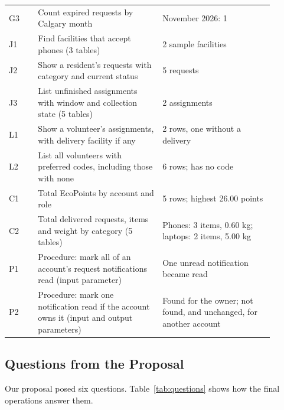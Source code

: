 \documentclass[11pt,letterpaper]{article}
\begin{document}
{\begin{longtable}{@{}lL{0.47\linewidth}L{0.42\linewidth}@{}}
G3 & Count expired requests by Calgary month & November 2026: 1 \\
J1 & Find facilities that accept phones (3 tables) & 2 sample facilities \\
J2 & Show a resident's requests with category and current status & 5 requests \\
J3 & List unfinished assignments with window and collection state (5 tables) & 2 assignments \\
L1 & Show a volunteer's assignments, with delivery facility if any & 2 rows, one without a delivery \\
L2 & List all volunteers with preferred codes, including those with none & 6 rows;  has no code \\
C1 & Total EcoPoints by account and role & 5 rows; highest 26.00 points \\
C2 & Total delivered requests, items and weight by category (5 tables) & Phones: 3 items, 0.60 kg; laptops: 2 items, 5.00 kg \\
P1 & Procedure: mark all of an account's request notifications read (input parameter) & One unread notification became read \\
P2 & Procedure: mark one notification read if the account owns it (input and output parameters) & Found for the owner; not found, and unchanged, for another account \\
\end{longtable}
}

\subsection{Questions from the Proposal}
Our proposal posed six questions. Table~\ref{tab:questions} shows how the final operations answer them.
\end{document}
